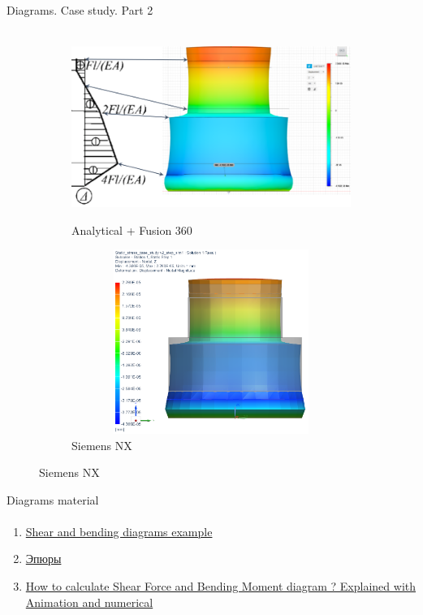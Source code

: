 \documentclass[aspectratio=169]{beamer}
\begin{document}
\begin{frame}[t]{Diagrams. Case study. Part 2}
\framesubtitle{}
    \vspace{-0.6cm}
    \begin{figure}[H]
        \begin{subfigure}{0.59\textwidth}
            \centering\includegraphics[height=6cm,width=1\textwidth,keepaspectratio]{fusion.png}
            \caption*{Analytical + Fusion 360}
            \label{fig:fusion.png}
        \end{subfigure}
        \begin{subfigure}{0.39\textwidth}
            \centering\includegraphics[height=6cm,width=1\textwidth,keepaspectratio]{Static_stress_case_study_v2_step_sim1.png}
            \caption*{Siemens NX}
            \label{fig:Static_stress_case_study_v2_step_sim1.png}
        \end{subfigure}
    \end{figure}
\end{frame}

\begin{frame}[t]{Diagrams material}
    \framesubtitle{}
    \begin{enumerate}
        \item \href{https://youtu.be/BjFghX-MScA}{Shear and bending diagrams example}
        \item \href{https://youtu.be/Kj3IKgp4020}{Эпюры}
        \item \href{https://youtu.be/hSb6NVYVl30}{How to calculate Shear Force and Bending Moment diagram ? Explained with Animation and numerical}
    \end{enumerate}
    \end{frame}
\end{document}
